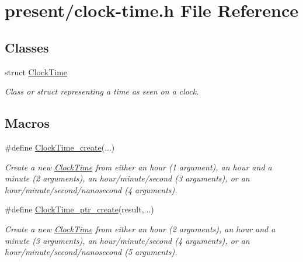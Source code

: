 \hypertarget{clock-time_8h}{\section{present/clock-\/time.h File Reference}
\label{clock-time_8h}
}
\subsection*{Classes}
\begin{DoxyCompactItemize}
\item 
struct \hyperlink{structClockTime}{Clock\-Time}
\begin{DoxyCompactList}\small\item\em Class or struct representing a time as seen on a clock. \end{DoxyCompactList}\end{DoxyCompactItemize}
\subsection*{Macros}
\begin{DoxyCompactItemize}
\item 
\#define \hyperlink{clock-time_8h_a58ff623c2c94ef13508ea9d85cbdfad7}{Clock\-Time\-\_\-create}(...)
\begin{DoxyCompactList}\small\item\em Create a new \hyperlink{structClockTime}{Clock\-Time} from either an hour (1 argument), an hour and a minute (2 arguments), an hour/minute/second (3 arguments), or an hour/minute/second/nanosecond (4 arguments). \end{DoxyCompactList}\item 
\#define \hyperlink{clock-time_8h_a113da7d2057c3219a6b72e39ab9795ce}{Clock\-Time\-\_\-ptr\-\_\-create}(result,...)
\begin{DoxyCompactList}\small\item\em Create a new \hyperlink{structClockTime}{Clock\-Time} from either an hour (2 arguments), an hour and a minute (3 arguments), an hour/minute/second (4 arguments), or an hour/minute/second/nanosecond (5 arguments). \end{DoxyCompactList}\end{DoxyCompactItemize}
